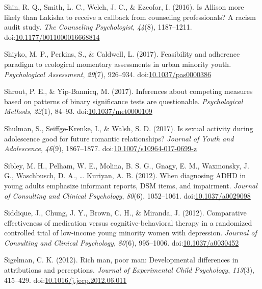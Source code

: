 \documentclass[english,man]{apa6}
\theoremstyle{definition}
\theoremstyle{definition}
\theoremstyle{definition}
\theoremstyle{remark}
\begin{document}
\hypertarget{ref-Shin2016}{}
Shin, R. Q., Smith, L. C., Welch, J. C., \& Ezeofor, I. (2016). Is
Allison more likely than Lakisha to receive a callback from counseling
professionals? A racism audit study. \emph{The Counseling Psychologist},
\emph{44}(8), 1187--1211.
doi:\href{https://doi.org/10.1177/0011000016668814}{10.1177/0011000016668814}

\hypertarget{ref-Shiyko2017}{}
Shiyko, M. P., Perkins, S., \& Caldwell, L. (2017). Feasibility and
adherence paradigm to ecological momentary assessments in urban minority
youth. \emph{Psychological Assessment}, \emph{29}(7), 926--934.
doi:\href{https://doi.org/10.1037/pas0000386}{10.1037/pas0000386}

\hypertarget{ref-Shrout2017}{}
Shrout, P. E., \& Yip-Bannicq, M. (2017). Inferences about competing
measures based on patterns of binary significance tests are
questionable. \emph{Psychological Methods}, \emph{22}(1), 84--93.
doi:\href{https://doi.org/10.1037/met0000109}{10.1037/met0000109}

\hypertarget{ref-Shulman2017}{}
Shulman, S., Seiffge-Krenke, I., \& Walsh, S. D. (2017). Is sexual
activity during adolescence good for future romantic relationships?
\emph{Journal of Youth and Adolescence}, \emph{46}(9), 1867--1877.
doi:\href{https://doi.org/10.1007/s10964-017-0699-z}{10.1007/s10964-017-0699-z}

\hypertarget{ref-Sibley2012}{}
Sibley, M. H., Pelham, W. E., Molina, B. S. G., Gnagy, E. M., Waxmonsky,
J. G., Waschbusch, D. A., \ldots{} Kuriyan, A. B. (2012). When
diagnosing ADHD in young adults emphasize informant reports, DSM items,
and impairment. \emph{Journal of Consulting and Clinical Psychology},
\emph{80}(6), 1052--1061.
doi:\href{https://doi.org/10.1037/a0029098}{10.1037/a0029098}

\hypertarget{ref-Siddique2012}{}
Siddique, J., Chung, J. Y., Brown, C. H., \& Miranda, J. (2012).
Comparative effectiveness of medication versus cognitive-behavioral
therapy in a randomized controlled trial of low-income young minority
women with depression. \emph{Journal of Consulting and Clinical
Psychology}, \emph{80}(6), 995--1006.
doi:\href{https://doi.org/10.1037/a0030452}{10.1037/a0030452}

\hypertarget{ref-Sigelman2012}{}
Sigelman, C. K. (2012). Rich man, poor man: Developmental differences in
attributions and perceptions. \emph{Journal of Experimental Child
Psychology}, \emph{113}(3), 415--429.
doi:\href{https://doi.org/10.1016/j.jecp.2012.06.011}{10.1016/j.jecp.2012.06.011}
\end{document}
